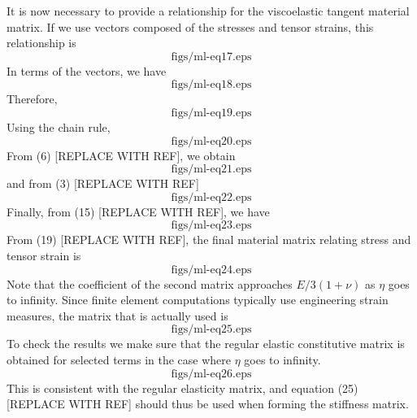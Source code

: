It is now necessary to provide a relationship for the viscoelastic
tangent material matrix. If we use vectors composed of the stresses
and tensor strains, this relationship is
\begin{equation}
  \text{figs/ml-eq17.eps}
\end{equation}
In terms of the vectors, we have
\begin{equation}
  \text{figs/ml-eq18.eps}
\end{equation}
Therefore,
\begin{equation}
  \text{figs/ml-eq19.eps}
\end{equation}
Using the chain rule,
\begin{equation}
  \text{figs/ml-eq20.eps}
\end{equation}
From (6) [REPLACE WITH REF], we obtain
\begin{equation}
  \text{figs/ml-eq21.eps}
\end{equation}
and from (3) [REPLACE WITH REF]
\begin{equation}
  \text{figs/ml-eq22.eps}
\end{equation}
Finally, from (15) [REPLACE WITH REF], we have
\begin{equation}
  \text{figs/ml-eq23.eps}
\end{equation}
From (19) [REPLACE WITH REF], the final material matrix relating
stress and tensor strain is
\begin{equation}
  \text{figs/ml-eq24.eps}
\end{equation}
Note that the coefficient of the second matrix approaches $E/3(1+\nu)$
as $\eta$ goes to infinity. Since finite element computations
typically use engineering strain measures, the matrix that is actually
used is
\begin{equation}
  \text{figs/ml-eq25.eps}
\end{equation}
To check the results we make sure that the regular elastic
constitutive matrix is obtained for selected terms in the case where
$\eta$ goes to infinity.
\begin{equation}
  \text{figs/ml-eq26.eps}
\end{equation}
This is consistent with the regular elasticity matrix, and equation
(25) [REPLACE WITH REF] should thus be used when forming the stiffness
matrix.
